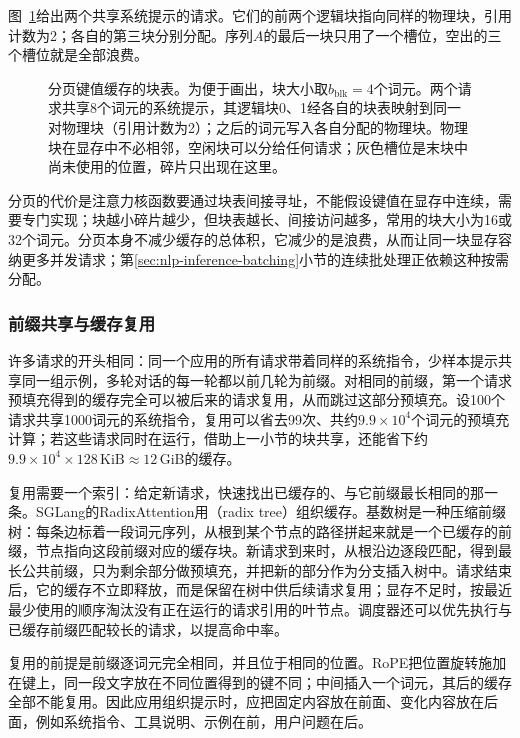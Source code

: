 图~\ref{fig:nlp-inference-paged-kv}给出两个共享系统提示的请求。它们的前两个逻辑块指向同样的物理块，引用计数为2；各自的第三块分别分配。序列$A$的最后一块只用了一个槽位，空出的三个槽位就是全部浪费。

\begin{figure}[htbp]
  \centering
  
  \caption{分页键值缓存的块表。为便于画出，块大小取$b_{\mathrm{blk}}=4$个词元。两个请求共享8个词元的系统提示，其逻辑块0、1经各自的块表映射到同一对物理块（引用计数为2）；之后的词元写入各自分配的物理块。物理块在显存中不必相邻，空闲块可以分给任何请求；灰色槽位是末块中尚未使用的位置，碎片只出现在这里。}
  \label{fig:nlp-inference-paged-kv}
\end{figure}

分页的代价是注意力核函数要通过块表间接寻址，不能假设键值在显存中连续，需要专门实现；块越小碎片越少，但块表越长、间接访问越多，常用的块大小为16或32个词元。分页本身不减少缓存的总体积，它减少的是浪费，从而让同一块显存容纳更多并发请求；第\ref{sec:nlp-inference-batching}小节的连续批处理正依赖这种按需分配。

\subsubsection{前缀共享与缓存复用}
\label{sec:nlp-inference-prefix-cache}

许多请求的开头相同：同一个应用的所有请求带着同样的系统指令，少样本提示共享同一组示例，多轮对话的每一轮都以前几轮为前缀。对相同的前缀，第一个请求预填充得到的缓存完全可以被后来的请求复用，从而跳过这部分预填充。设100个请求共享1000词元的系统指令，复用可以省去99次、共约$9.9\times10^4$个词元的预填充计算；若这些请求同时在运行，借助上一小节的块共享，还能省下约$9.9\times10^4\times128\,\mathrm{KiB}\approx12$\,GiB的缓存。

复用需要一个索引：给定新请求，快速找出已缓存的、与它前缀最长相同的那一条。SGLang的RadixAttention用（radix tree）组织缓存。基数树是一种压缩前缀树：每条边标着一段词元序列，从根到某个节点的路径拼起来就是一个已缓存的前缀，节点指向这段前缀对应的缓存块。新请求到来时，从根沿边逐段匹配，得到最长公共前缀，只为剩余部分做预填充，并把新的部分作为分支插入树中。请求结束后，它的缓存不立即释放，而是保留在树中供后续请求复用；显存不足时，按最近最少使用的顺序淘汰没有正在运行的请求引用的叶节点。调度器还可以优先执行与已缓存前缀匹配较长的请求，以提高命中率。

复用的前提是前缀逐词元完全相同，并且位于相同的位置。RoPE把位置旋转施加在键上，同一段文字放在不同位置得到的键不同；中间插入一个词元，其后的缓存全部不能复用。因此应用组织提示时，应把固定内容放在前面、变化内容放在后面，例如系统指令、工具说明、示例在前，用户问题在后。

